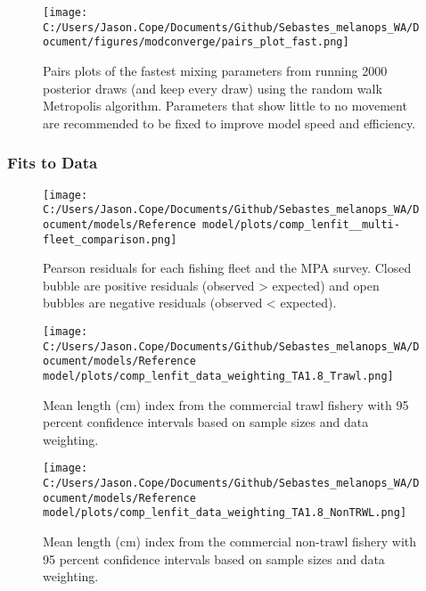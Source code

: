 \documentclass[11pt,
  english,
  letterpaper,
]{article}
\begin{document}
\begin{figure}
\centering
\texttt{[image: C:/Users/Jason.Cope/Documents/Github/Sebastes\_melanops\_WA/Document/figures/modconverge/pairs\_plot\_fast.png]}
\caption{Pairs plots of the fastest mixing parameters from running 2000 posterior draws (and keep every draw) using the random walk Metropolis algorithm. Parameters that show little to no movement are recommended to be fixed to improve model speed and efficiency.\label{fig:pairs_plot_fast}}
\end{figure}

\clearpage

\hypertarget{fits-to-data}{%
\subsubsection{Fits to Data}\label{fits-to-data}}

\begin{figure}
\centering
\texttt{[image: C:/Users/Jason.Cope/Documents/Github/Sebastes\_melanops\_WA/Document/models/Reference model/plots/comp\_lenfit\_\_multi-fleet\_comparison.png]}
\caption{Pearson residuals for each fishing fleet and the MPA survey. Closed bubble are positive residuals (observed \textgreater{} expected) and open bubbles are negative residuals (observed \textless{} expected).\label{fig:lt-pearson-resids}}
\end{figure}

\pagebreak

\begin{figure}
\centering
\texttt{[image: C:/Users/Jason.Cope/Documents/Github/Sebastes\_melanops\_WA/Document/models/Reference model/plots/comp\_lenfit\_data\_weighting\_TA1.8\_Trawl.png]}
\caption{Mean length (cm) index from the commercial trawl fishery with 95 percent confidence intervals based on sample sizes and data weighting.\label{fig:trawl-mean-len-fit}}
\end{figure}

\pagebreak

\begin{figure}
\centering
\texttt{[image: C:/Users/Jason.Cope/Documents/Github/Sebastes\_melanops\_WA/Document/models/Reference model/plots/comp\_lenfit\_data\_weighting\_TA1.8\_NonTRWL.png]}
\caption{Mean length (cm) index from the commercial non-trawl fishery with 95 percent confidence intervals based on sample sizes and data weighting.\label{fig:nontrawl-mean-len-fit}}
\end{figure}
\end{document}
